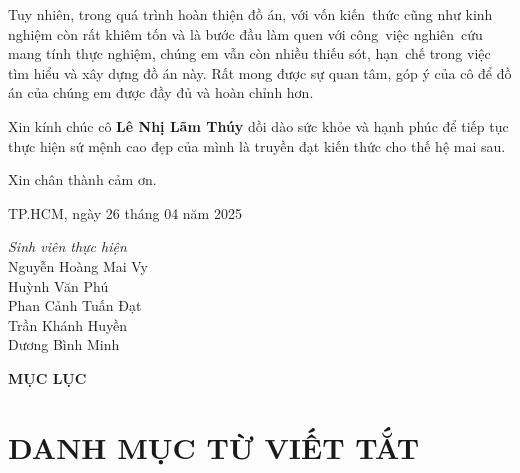 \documentclass[a4paper,12pt]{report}
\begin{document}
\vspace{1em}

\quad Tuy nhiên, trong quá trình hoàn thiện đồ án, với vốn kiến~thức cũng như kinh nghiệm còn rất khiêm tốn và là bước đầu làm quen với công~việc nghiên~cứu mang tính thực nghiệm, chúng em vẫn còn nhiều thiếu sót, hạn~chế trong việc tìm hiểu và xây dựng đồ án này. Rất mong được sự quan tâm, góp ý của cô để đồ án của chúng em được đầy đủ và hoàn chỉnh hơn.

\vspace{1em}

\quad Xin kính chúc cô \textbf{Lê Nhị Lãm Thúy} dồi dào sức khỏe và hạnh phúc để tiếp tục thực hiện sứ mệnh cao đẹp của mình là truyền đạt kiến thức cho thế hệ mai sau.

\vspace{1em}

\quad Xin chân thành cảm ơn.

\vspace{2em}

\begin{flushright}
    TP.HCM, ngày 26 tháng 04 năm 2025

    \vspace{1em}
    \textit{Sinh viên thực hiện} \\
    \vspace{1em}
    Nguyễn Hoàng Mai Vy\\
    \vspace{0.5em}
    Huỳnh Văn Phú\\
    \vspace{0.5em}
    Phan Cảnh Tuấn Đạt\\
    \vspace{0.5em}
    Trần Khánh Huyền\\
    \vspace{0.5em}
    Dương Bình Minh
\end{flushright}

\newpage
\begin{center}
    \Large\textbf{MỤC LỤC}
\end{center}
\vspace{-115pt}

\renewcommand{\contentsname}{} %
\tableofcontents
\newpage


\clearpage
\chapter*{\centering DANH MỤC TỪ VIẾT TẮT}
\end{document}
